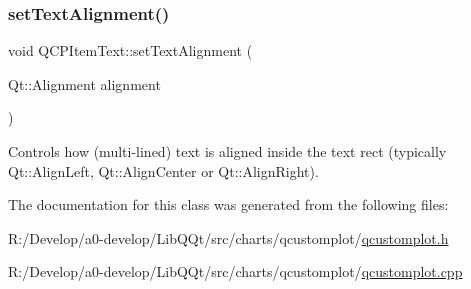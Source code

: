 \subsubsection{\texorpdfstring{set\+Text\+Alignment()}{setTextAlignment()}}
{\footnotesize\ttfamily void Q\+C\+P\+Item\+Text\+::set\+Text\+Alignment (\begin{DoxyParamCaption}\item[{Qt\+::\+Alignment}]{alignment }\end{DoxyParamCaption})}

Controls how (multi-\/lined) text is aligned inside the text rect (typically Qt\+::\+Align\+Left, Qt\+::\+Align\+Center or Qt\+::\+Align\+Right). 

The documentation for this class was generated from the following files\+:\begin{DoxyCompactItemize}
\item 
R\+:/\+Develop/a0-\/develop/\+Lib\+Q\+Qt/src/charts/qcustomplot/\mbox{\hyperlink{qcustomplot_8h}{qcustomplot.\+h}}\item 
R\+:/\+Develop/a0-\/develop/\+Lib\+Q\+Qt/src/charts/qcustomplot/\mbox{\hyperlink{qcustomplot_8cpp}{qcustomplot.\+cpp}}\end{DoxyCompactItemize}
